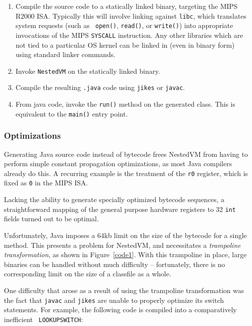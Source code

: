 \documentclass{acmconf}
\begin{document}
\begin{enumerate}

\item Compile the source code to a statically linked binary, targeting
      the MIPS R2000 ISA.  Typically this will involve linking against
      {\tt libc}, which translates system requests (such as {\tt
      open()}, {\tt read()}, or {\tt write()}) into appropriate
      invocations of the MIPS {\tt SYSCALL} instruction.  Any other
      libraries which are not tied to a particular OS kernel can be
      linked in (even in binary form) using standard linker commands.
      
\item Invoke {\tt NestedVM} on the statically linked binary.

\item Compile the resulting {\tt .java} code using {\tt jikes}
      \cite{jikes} or {\tt javac}.

\item From java code, invoke the {\tt run()} method on the generated
      class.  This is equivalent to the {\tt main()} entry point.

\end{enumerate}

\subsubsection{Optimizations}

Generating Java source code instead of bytecode frees NestedVM from
having to perform simple constant propagation optimizations, as most
Java compilers already do this.  A recurring example is the treatment
of the {\tt r0} register, which is fixed as {\tt 0} in the MIPS ISA.

Lacking the ability to generate specially optimized bytecode
sequences, a straightforward mapping of the general purpose hardware
registers to 32 {\tt int} fields turned out to be optimal.



Unfortunately, Java imposes a 64kb limit on the size of the bytecode
for a single method.  This presents a problem for NestedVM, and
necessitates a {\it trampoline transformation}, as shown in
Figure~\ref{code1}.  With this trampoline in place, large binaries can
be handled without much difficulty -- fortunately, there is no
corresponding limit on the size of a classfile as a whole.

One difficulty that arose as a result of using the trampoline
transformation was the fact that {\tt javac} and {\tt jikes} are
unable to properly optimize its switch statements.  For example, the
following code is compiled into a comparatively inefficient {\tt
LOOKUPSWITCH}:
\end{document}
